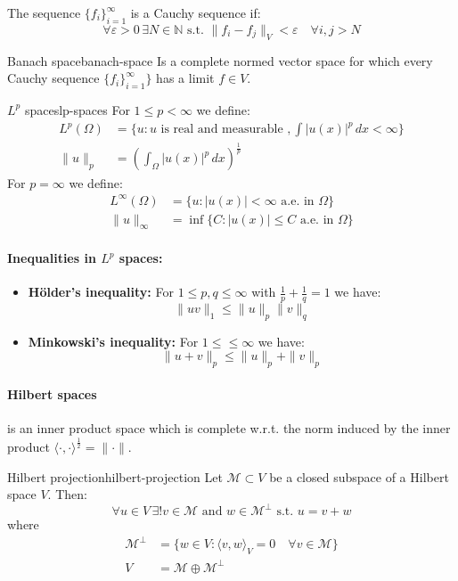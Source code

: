 The sequence $\{f_i\}_{i=1}^\infty$ is a Cauchy sequence if:
\[
    \forall \varepsilon > 0 \, \exists N \in \mathbb{N} \text{ s.t. } \|f_i - f_j\|_V < \varepsilon \quad \forall i, j > N
\]

\begin{definition}{Banach space}{banach-space}
    Is a complete normed vector space for which every Cauchy sequence $\{f_i\}_{i=1}^\infty\}$ has a limit $f \in V$.
\end{definition}

\begin{definition}{$L^p$ spaces}{lp-spaces}
    For $1 \leq p < \infty$ we define:
    \begin{align*}
        L^p(\Omega) & = \{u : u \text{ is real and measurable }, \int |u(x)|^p \, dx < \infty\} \\
        \|u\|_p     & = \left(\int_\Omega |u(x)|^p \, dx\right)^{\frac{1}{p}} \tag{norm}
    \end{align*}
    For $p = \infty$ we define:
    \begin{align*}
        L^\infty(\Omega) & = \{u : |u(x)| < \infty \text{ a.e. in } \Omega\}   \\
        \|u\|_\infty     & = \inf\{C : |u(x)| \leq C \text{ a.e. in } \Omega\}
    \end{align*}
\end{definition}

\paragraph{Inequalities in $L^p$ spaces:}
\begin{itemize}
    \item \textbf{Hölder's inequality:} For $1 \leq p, q \leq \infty$ with $\frac{1}{p} + \frac{1}{q} = 1$ we have:
          \[
              \|uv\|_1 \leq \|u\|_p \|v\|_q
          \]
    \item \textbf{Minkowski's inequality:} For $1 \leq \leq \infty$ we have:
          \[
              \|u + v\|_p \leq \|u\|_p + \|v\|_p
          \]
\end{itemize}

\paragraph{Hilbert spaces} is an inner product space which is complete w.r.t. the norm induced by the inner product $\langle \cdot, \cdot \rangle^{\frac12} = \|\cdot\|$.

\begin{theorem}{Hilbert projection}{hilbert-projection}
    Let $\mathcal{M} \subset V$ be a closed subspace of a Hilbert space $V$. Then:
    \[
        \forall u \in V \, \exists! v \in \mathcal{M} \text{ and } w \in \mathcal{M}^\perp \text{ s.t. } u = v + w
    \]
    where
    \begin{align*}
        \mathcal{M}^\perp & = \{w \in V : \langle v, w \rangle_V = 0 \quad \forall v \in \mathcal{M}\} \\
        V                 & = \mathcal{M} \oplus \mathcal{M}^\perp
    \end{align*}
\end{theorem}

